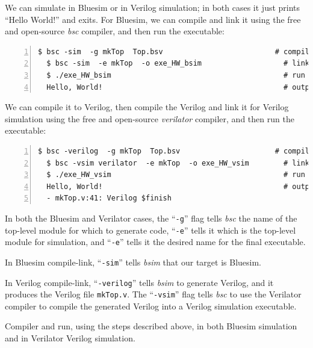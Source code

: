 \vspace{1ex}

We can simulate in Bluesim or in Verilog simulation; in both cases it
just prints ``Hello World!'' and exits.  For Bluesim, we can compile
and link it using the free and open-source \emph{bsc} compiler, and
then run the executable:

{\small
\begin{Verbatim}[frame=single, numbers=left]
  $ bsc -sim  -g mkTop  Top.bsv                          # compile
  $ bsc -sim  -e mkTop  -o exe_HW_bsim                   # link
  $ ./exe_HW_bsim                                        # run
  Hello, World!                                          # output
\end{Verbatim}
}

We can compile it to Verilog, then compile the Verilog and link it for
Verilog simulation using the free and open-source \emph{verilator}
compiler, and then run the executable:

{\small
\begin{Verbatim}[frame=single, numbers=left]
  $ bsc -verilog  -g mkTop  Top.bsv                      # compile -> mkTop.v
  $ bsc -vsim verilator  -e mkTop  -o exe_HW_vsim        # link
  $ ./exe_HW_vsim                                        # run
  Hello, World!                                          # output
  - mkTop.v:41: Verilog $finish
\end{Verbatim}
}

In both the Bluesim and Verilator cases, the ``\verb|-g|'' flag tells
\emph{bsc} the name of the top-level module for which to generate
code, ``\verb|-e|'' tells it which is the top-level module for
simulation, and ``\verb|-e|'' tells it the desired name for the final
executable.

In Bluesim compile-link, ``\verb|-sim|'' tells \emph{bsim} that our
target is Bluesim.

In Verilog compile-link, ``\verb|-verilog|'' tells \emph{bsim} to
generate Verilog, and it produces the Verilog file \verb|mkTop.v|.
The ``\verb|-vsim|'' flag tells \emph{bsc} to use the Verilator
compiler to compile the generated Verilog into a Verilog simulation
executable.

\Beginexercise

\Exercise

Compiler and run, using the steps described above, in both Bluesim
simulation and in Verilator Verilog simulation.

